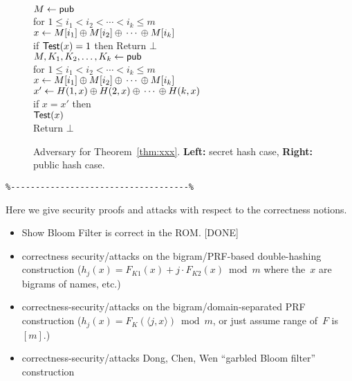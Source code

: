 \begin{figure}
\centering
{}
{
\\
$M \gets {\sf pub}$\\
for $1 \leq i_1 < i_2 < \cdots < i_k \leq m$\\
\nudge $x \gets M[i_1] {\:\oplus\:} M[i_2] {\:\oplus\:} \cdots {\:\oplus\:} M[i_k]$\\
\nudge if $\mathsf{Test}(x)=1$ then Return $\bot$
}
{
\\
$M,K_1,K_2,\ldots,K_k \gets {\sf pub}$\\
for $1 \leq i_1 < i_2 < \cdots < i_k \leq m$\\
\nudge $x \gets M[i_1] {\:\oplus\:} M[i_2] {\:\oplus\:} \cdots {\:\oplus\:} M[i_k]$\\
\nudge $x' \gets H(1,x) {\:\oplus\:} H(2,x) {\:\oplus\:} \cdots {\:\oplus\:} H(k,x)$\\
\nudge if $x=x'$ then\\
\nudge\nudge $\mathsf{Test}(x)$\\
\nudge\nudge Return $\bot$\\
}

\caption{Adversary for Theorem~\ref{thm:xxx}.  \textbf{Left:} secret hash case, \textbf{Right:} public hash case.}
\label{fig:adv-bi-lin-ss}
\end{figure}



\begin{verbatim}
%------------------------------------%
\end{verbatim}


  Here we give security proofs and attacks with respect to the correctness notions.
\begin{itemize}
\item Show Bloom Filter is correct in the ROM.  [DONE]
\item correctness security/attacks on the bigram/PRF-based double-hashing construction ($h_j(x) = F_{K1}(x) + j\cdot F_{K2}(x) \bmod m$ where the~$x$ are bigrams of names, etc.)
\item correctness-security/attacks on the bigram/domain-separated PRF construction ($h_j(x)=F_K(\langle j,x \rangle) \bmod m$, or just assume range of~$F$ is $[m]$.) 
\item correctness-security/attacks Dong, Chen, Wen ``garbled Bloom filter'' construction

\end{itemize}

